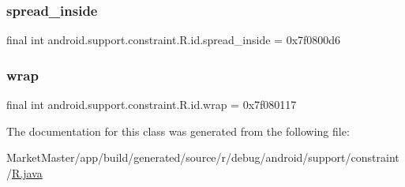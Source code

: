 \subsubsection{\texorpdfstring{spread\+\_\+inside}{spread\_inside}}
{\footnotesize\ttfamily final int android.\+support.\+constraint.\+R.\+id.\+spread\+\_\+inside = 0x7f0800d6\hspace{0.3cm}{\ttfamily [static]}}

\mbox{\label{classandroid_1_1support_1_1constraint_1_1R_1_1id_ae0562e247c624b01fdf91a6e003f141d}} 
\subsubsection{\texorpdfstring{wrap}{wrap}}
{\footnotesize\ttfamily final int android.\+support.\+constraint.\+R.\+id.\+wrap = 0x7f080117\hspace{0.3cm}{\ttfamily [static]}}



The documentation for this class was generated from the following file\+:\begin{DoxyCompactItemize}
\item 
Market\+Master/app/build/generated/source/r/debug/android/support/constraint/\mbox{\hyperlink{debug_2android_2support_2constraint_2R_8java}{R.\+java}}\end{DoxyCompactItemize}
